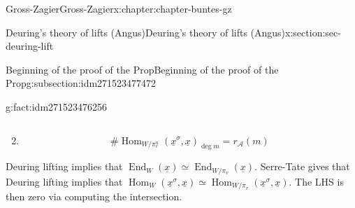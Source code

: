 \documentclass[oneside,10pt,]{book}
\numberwithin{equation}{section}
\DeclareMathOperator{\End}{End}
\DeclareMathOperator{\Hom}{Hom}
\begin{document}
\begin{chapterptx}{Gross-Zagier}{}{Gross-Zagier}{}{}{x:chapter:chapter-buntes-gz}
\begin{sectionptx}{Deuring's theory of lifts (Angus)}{}{Deuring's theory of lifts (Angus)}{}{}{x:section:sec-deuring-lift}
\begin{subsectionptx}{Beginning of the proof of the Prop}{}{Beginning of the proof of the Prop}{}{}{g:subsection:idm271523477472}
\begin{fact}{}{}{g:fact:idm271523476256}
\begin{enumerate}
\begin{equation*}
\end{equation*}
%
\item{}%
\begin{equation*}
\# \Hom_{W/\pi _v^n}(\underline x^\sigma , \underline x)_{\deg m} = r_{\mathscr A}(m)
\end{equation*}
%
\end{enumerate}
%
\end{fact}
Deuring lifting implies that \(\End_W(\underline x) \simeq \End_{W/\pi _v}(\underline x)\). Serre-Tate gives that Deuring lifting implies that \(\Hom_W(\underline x^\sigma , \underline x) \simeq \Hom_{W/\pi _v}(\underline x^\sigma , \underline x)\). The LHS is then zero via computing the intersection.%
\end{subsectionptx}
\end{sectionptx}
\end{chapterptx}
%
\backmatter
%
%
%
%
%
\typeout{************************************************}
\typeout{************************************************}
%
\end{document}
